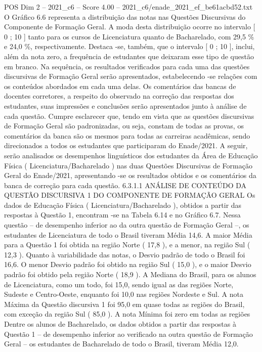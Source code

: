 \begin{textsample}{POS Dim 2 – 2021\_c6 – Score 4.00 – 2021\_c6/enade\_2021\_ef\_be61acbd52.txt}
O Gráfico 6.6 representa a distribuição das notas nas Questões Discursivas do Componente de Formação Geral.
A moda desta distribuição ocorre no intervalo [ 0 ; 10 ] tanto para os cursos de Licenciatura quanto de Bacharelado, com 29,5 \% e 24,0 \%, respectivamente.
Destaca -se, também, que o intervalo [ 0 ; 10 ], inclui, além da nota zero, a frequência de estudantes que deixaram esse tipo de questão em branco.
Na sequência, os resultados verificados para cada uma das questões discursivas de Formação Geral serão apresentados, estabelecendo -se relações com os conteúdos abordados em cada uma delas.
Os comentários das bancas de docentes corretores, a respeito do observado na correção das respostas dos estudantes, suas impressões e conclusões serão apresentados junto à análise de cada questão.
Cumpre esclarecer que, tendo em vista que as questões discursivas de Formação Geral são padronizadas, ou seja, constam de todas as provas, os comentários da banca são os mesmos para todas as carreiras acadêmicas, sendo direcionados a todos os estudantes que participaram do Enade/2021.
A seguir, serão analisados os desempenhos linguísticos dos estudantes da Área de Educação Física ( Licenciatura/Bacharelado ) nas duas Questões Discursivas de Formação Geral do Enade/2021, apresentando -se os resultados obtidos e os comentários da banca de correção para cada questão. 6.3.1.1 ANÁLISE DE CONTEÚDO DA QUESTÃO DISCURSIVA 1 DO COMPONENTE DE FORMAÇÃO GERAL Os dados de Educação Física ( Licenciatura/Bacharelado ), obtidos a partir das respostas à Questão 1, encontram -se na Tabela 6.14 e no Gráfico 6.7.
Nessa questão – de desempenho inferior ao da outra questão de Formação Geral –, os estudantes de Licenciatura de todo o Brasil tiveram Média 14,6.
A maior Média para a Questão 1 foi obtida na região Norte ( 17,8 ), e a menor, na região Sul ( 12,3 ).
Quanto à variabilidade das notas, o Desvio padrão de todo o Brasil foi 16,6.
O menor Desvio padrão foi obtido na região Sul ( 15,0 ), e o maior Desvio padrão foi obtido pela região Norte ( 18,9 ).
A Mediana do Brasil, para os alunos de Licenciatura, como um todo, foi 15,0, sendo igual as das regiões Norte, Sudeste e Centro-Oeste, enquanto foi 10,0 nas regiões Nordeste e Sul.
A nota Máxima da Questão discursiva 1 foi 95,0 em quase todas as regiões do Brasil, com exceção da região Sul ( 85,0 ).
A nota Mínima foi zero em todas as regiões Dentre os alunos de Bacharelado, os dados obtidos a partir das respostas à Questão 1 – de desempenho inferior ao verificado na outra questão de Formação Geral – os estudantes de Bacharelado de todo o Brasil, tiveram Média 12,0.

\end{textsample}
